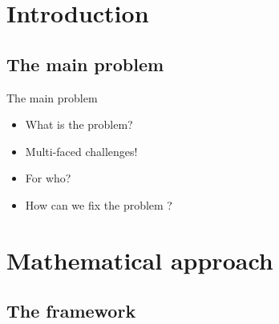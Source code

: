 \documentclass[unknownkeysallowed]{beamer}
\begin{document}
\section{Introduction}
\label{sec:Introduction}

\subsection{The main problem}
\label{sub:The main problem}

\begin{frame}{The main problem}

\begin{itemize}
    \item What is the problem?
    \item Multi-faced challenges!
    \item For who?
    \item How can we fix the problem ?
\end{itemize}
\end{frame}

\section{Mathematical approach}
\label{sec:Mathematical approach}

\subsection{The framework}
\label{sub:The framework}
\end{document}
